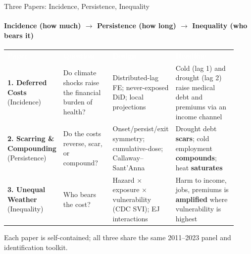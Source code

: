 \documentclass[aspectratio=169,11pt]{beamer}
\newcommand{\emphcolor}[1]{{\color{WarmOrange}\textbf{#1}}}
\newcommand{\graytext}[1]{{\color{WarmGray}#1}}
\begin{document}
\begin{frame}{Three Papers: Incidence, Persistence, Inequality}
  \framesubtitle{Incidence (how much) \(\to\) Persistence (how long) \(\to\) Inequality (who bears it)}
  \footnotesize
  \renewcommand{\arraystretch}{1.25}
  \begin{tabular}{@{}>{\raggedright\arraybackslash}p{0.10\linewidth}>{\raggedright\arraybackslash}p{0.24\linewidth}>{\raggedright\arraybackslash}p{0.27\linewidth}>{\raggedright\arraybackslash}p{0.31\linewidth}@{}}
    \rowcolor{DeepNavy}
    \textcolor{white}{\textbf{Paper}} &
    \textcolor{white}{\textbf{Question}} &
    \textcolor{white}{\textbf{Design}} &
    \textcolor{white}{\textbf{Headline}} \\
    \rowcolor{Teal!10}
    \textbf{1. Deferred Costs} \graytext{(Incidence)}
      & Do climate shocks raise the financial burden of health?
      & Distributed-lag FE; never-exposed DiD; local projections
      & Cold (lag 1) and drought (lag 2) raise medical debt and premiums via an income channel \\
    \textbf{2. Scarring \& Compounding} \graytext{(Persistence)}
      & Do the costs reverse, scar, or compound?
      & Onset/persist/exit symmetry; cumulative-dose; Callaway--Sant'Anna
      & Drought debt \emphcolor{scars}; cold employment \emphcolor{compounds}; heat \emphcolor{saturates} \\
    \rowcolor{Teal!10}
    \textbf{3. Unequal Weather} \graytext{(Inequality)}
      & Who bears the cost?
      & Hazard \(\times\) exposure \(\times\) vulnerability (CDC SVI); EJ interactions
      & Harm to income, jobs, premiums is \emphcolor{amplified} where vulnerability is highest \\
    \bottomrule
  \end{tabular}
  \vspace{0.3em}
  \begin{center}
    \graytext{\scriptsize Each paper is self-contained; all three share the same 2011--2023 panel and identification toolkit.}
  \end{center}
\end{frame}
\end{document}

